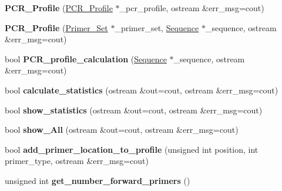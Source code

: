 \begin{DoxyCompactItemize}
\item 
\mbox{\label{class_p_c_r___profile_a4b621dd306d51186d84ac65929f14e7b}} 
{\bfseries P\+C\+R\+\_\+\+Profile} (\mbox{\hyperlink{class_p_c_r___profile}{P\+C\+R\+\_\+\+Profile}} $\ast$\+\_\+pcr\+\_\+profile, ostream \&err\+\_\+msg=cout)
\item 
\mbox{\label{class_p_c_r___profile_a2772873e5a43e8b8c1dde4b6ca9d8a2f}} 
{\bfseries P\+C\+R\+\_\+\+Profile} (\mbox{\hyperlink{class_primer___set}{Primer\+\_\+\+Set}} $\ast$\+\_\+primer\+\_\+set, \mbox{\hyperlink{class_sequence}{Sequence}} $\ast$\+\_\+sequence, ostream \&err\+\_\+msg=cout)
\item 
\mbox{\label{class_p_c_r___profile_a339a01da69e5e709f6b33678bd9f73dc}} 
bool {\bfseries P\+C\+R\+\_\+profile\+\_\+calculation} (\mbox{\hyperlink{class_sequence}{Sequence}} $\ast$\+\_\+sequence, ostream \&err\+\_\+msg=cout)
\item 
\mbox{\label{class_p_c_r___profile_a6f209d643d15a15c7a7b940e18df9497}} 
bool {\bfseries calculate\+\_\+statistics} (ostream \&out=cout, ostream \&err\+\_\+msg=cout)
\item 
\mbox{\label{class_p_c_r___profile_a9897676b415905e30809e69c399a859a}} 
bool {\bfseries show\+\_\+statistics} (ostream \&out=cout, ostream \&err\+\_\+msg=cout)
\item 
\mbox{\label{class_p_c_r___profile_aad744529e3bbcdc019d259667460340b}} 
bool {\bfseries show\+\_\+\+All} (ostream \&out=cout, ostream \&err\+\_\+msg=cout)
\item 
\mbox{\label{class_p_c_r___profile_a95758e5dff688b7b85bd1009ba28e112}} 
bool {\bfseries add\+\_\+primer\+\_\+location\+\_\+to\+\_\+profile} (unsigned int position, int primer\+\_\+type, ostream \&err\+\_\+msg=cout)
\item 
\mbox{\label{class_p_c_r___profile_a5222753c5f4b1568f7254be8fbc7c862}} 
unsigned int {\bfseries get\+\_\+number\+\_\+forward\+\_\+primers} ()
\item 
\mbox{\label{class_p_c_r___profile_a5470c4248e9c347b66ee1ad977d2a6f9}} 

\end{DoxyCompactItemize}
